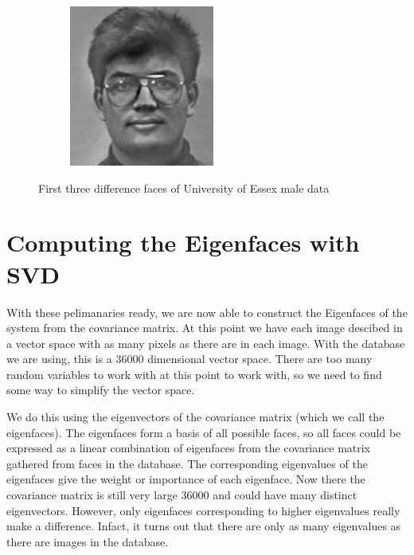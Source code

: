 \begin{figure}
\begin{subfigure}[b]{0.3\textwidth}
\end{subfigure}
\begin{subfigure}[b]{0.3\textwidth}
\includegraphics[width=\textwidth]{differenceFace2.png}
\end{subfigure}
\caption{First three difference faces of University of Essex male data}
\label{facialRecognition:differenceFaces}
\end{figure}

\section*{Computing the Eigenfaces with SVD}

With these pelimanaries ready, we are now able to construct the Eigenfaces of the system from the covariance matrix.
At this point we have each image descibed in a vector space with as many pixels as there are in each image.
With the database we are using, this is a 36000 dimensional vector space.
There are too many random variables to work with at this point to work with, so we need to find some way to simplify the vector space.

We do this using the eigenvectors of the covariance matrix (which we call the eigenfaces).
The eigenfaces form a basis of all possible faces, so all faces could be expressed as a linear combination of eigenfaces from the covariance matrix gathered from faces in the database.
The corresponding eigenvalues of the eigenfaces give the weight or importance of each eigenface.
Now there the covariance matrix is still very large 36000 and could have many distinct eigenvectors.
However, only eigenfaces corresponding to higher eigenvalues really make a difference.
Infact, it turns out that there are only as many eigenvalues as there are images in the database.

